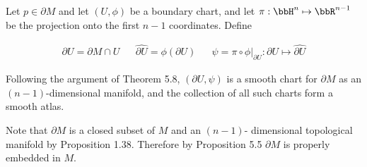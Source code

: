 Let $p \in \partial M$ and let $(U, \phi)$ be a boundary chart, and let $\pi:\bbH^n \mapsto \bbR^{n-1}$ be the projection onto the first $n-1$ coordinates.  Define

\begin{align*}
\partial U = \partial M \cap U && \hat{\partial U} = \phi(\partial U) && \psi = \pi \circ \phi|_{\partial U} : \partial U \mapsto \hat{\partial U}
\end{align*}

Following the argument of Theorem 5.8, $(\partial U, \psi)$ is a smooth chart for $\partial M$ as an $(n-1)$-dimensional manifold, and the collection of all such charts form a smooth atlas.

Note that $\partial M$ is a closed subset of $M$ and an $(n-1)$- dimensional topological manifold by Proposition 1.38.  Therefore by Proposition 5.5 $\partial M$ is properly embedded in $M$.

